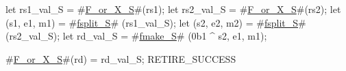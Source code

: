 let rs1_val_S    = #\hyperref[sailRISCVzFzyorzyXzyS]{F\_or\_X\_S}#(rs1);
let rs2_val_S    = #\hyperref[sailRISCVzFzyorzyXzyS]{F\_or\_X\_S}#(rs2);
let (s1, e1, m1) = #\hyperref[sailRISCVzfsplitzyS]{fsplit\_S}# (rs1_val_S);
let (s2, e2, m2) = #\hyperref[sailRISCVzfsplitzyS]{fsplit\_S}# (rs2_val_S);
let rd_val_S     = #\hyperref[sailRISCVzfmakezyS]{fmake\_S}# (0b1 ^ s2, e1, m1);

#\hyperref[sailRISCVzFzyorzyXzyS]{F\_or\_X\_S}#(rd) = rd_val_S;
RETIRE_SUCCESS

